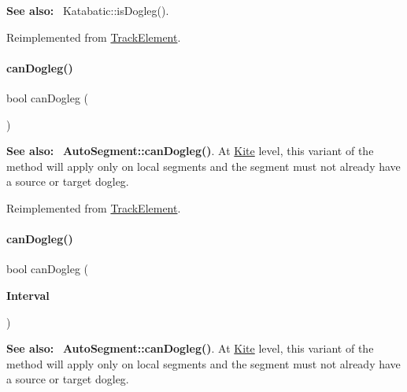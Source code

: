 {\bfseries See also\+:}~ Katabatic\+::is\+Dogleg(). 

Reimplemented from \mbox{\hyperlink{classKite_1_1TrackElement_a75d91371e5281dd21f60ff39ae70a3e5}{Track\+Element}}.

\mbox{\label{classKite_1_1TrackSegment_aa0bb6f1592688e942ff67e0ac318a4fd}} 
\paragraph{\texorpdfstring{can\+Dogleg()}{canDogleg()}\hspace{0.1cm}{\footnotesize\ttfamily [1/3]}}
{\footnotesize\ttfamily bool can\+Dogleg (\begin{DoxyParamCaption}{ }\end{DoxyParamCaption})\hspace{0.3cm}{\ttfamily [virtual]}}

{\bfseries See also\+:}~ \textbf{ Auto\+Segment\+::can\+Dogleg()}. At \mbox{\hyperlink{namespaceKite}{Kite}} level, this variant of the method will apply only on local segments and the segment must not already have a source or target dogleg. 

Reimplemented from \mbox{\hyperlink{classKite_1_1TrackElement_aa0bb6f1592688e942ff67e0ac318a4fd}{Track\+Element}}.

\mbox{\label{classKite_1_1TrackSegment_accb4c6a7ee2678a0cff4dbc4a7860fe1}} 
\paragraph{\texorpdfstring{can\+Dogleg()}{canDogleg()}\hspace{0.1cm}{\footnotesize\ttfamily [2/3]}}
{\footnotesize\ttfamily bool can\+Dogleg (\begin{DoxyParamCaption}\item[{\textbf{ Interval}}]{ }\end{DoxyParamCaption})\hspace{0.3cm}{\ttfamily [virtual]}}

{\bfseries See also\+:}~ \textbf{ Auto\+Segment\+::can\+Dogleg()}. At \mbox{\hyperlink{namespaceKite}{Kite}} level, this variant of the method will apply only on local segments and the segment must not already have a source or target dogleg. 

